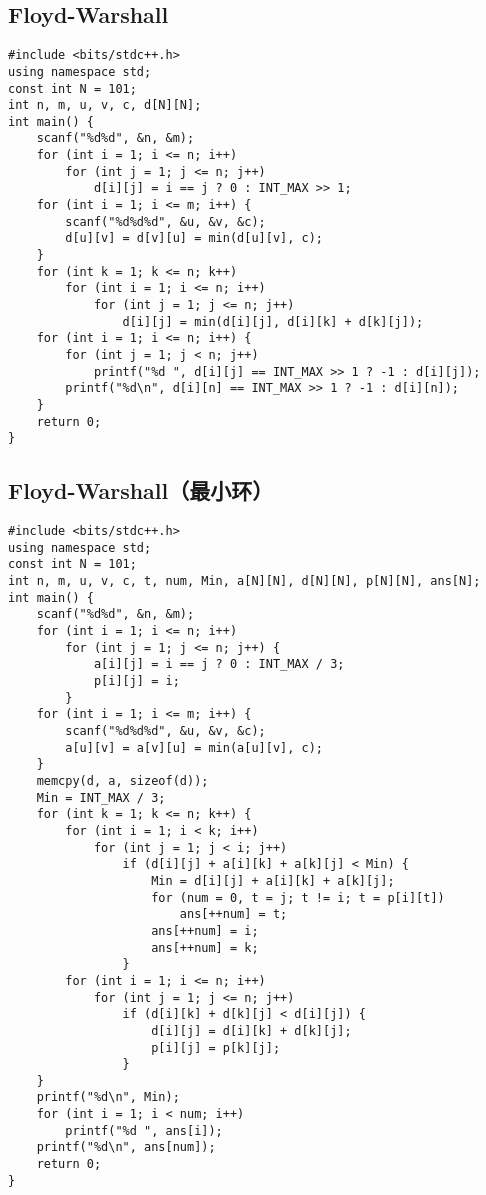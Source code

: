 \documentclass[a4paper]{article}
\begin{document}
\subsection{Floyd-Warshall}
\begin{lstlisting}
#include <bits/stdc++.h>
using namespace std;
const int N = 101;
int n, m, u, v, c, d[N][N];
int main() {
    scanf("%d%d", &n, &m);
    for (int i = 1; i <= n; i++)
        for (int j = 1; j <= n; j++)
            d[i][j] = i == j ? 0 : INT_MAX >> 1;
    for (int i = 1; i <= m; i++) {
        scanf("%d%d%d", &u, &v, &c);
        d[u][v] = d[v][u] = min(d[u][v], c);
    }
    for (int k = 1; k <= n; k++)
        for (int i = 1; i <= n; i++)
            for (int j = 1; j <= n; j++)
                d[i][j] = min(d[i][j], d[i][k] + d[k][j]);
    for (int i = 1; i <= n; i++) {
        for (int j = 1; j < n; j++)
            printf("%d ", d[i][j] == INT_MAX >> 1 ? -1 : d[i][j]);
        printf("%d\n", d[i][n] == INT_MAX >> 1 ? -1 : d[i][n]);
    }
    return 0;
}
\end{lstlisting}
\subsection{Floyd-Warshall（最小环）}
\begin{lstlisting}
#include <bits/stdc++.h>
using namespace std;
const int N = 101;
int n, m, u, v, c, t, num, Min, a[N][N], d[N][N], p[N][N], ans[N];
int main() {
    scanf("%d%d", &n, &m);
    for (int i = 1; i <= n; i++)
        for (int j = 1; j <= n; j++) {
            a[i][j] = i == j ? 0 : INT_MAX / 3;
            p[i][j] = i;
        }
    for (int i = 1; i <= m; i++) {
        scanf("%d%d%d", &u, &v, &c);
        a[u][v] = a[v][u] = min(a[u][v], c);
    }
    memcpy(d, a, sizeof(d));
    Min = INT_MAX / 3;
    for (int k = 1; k <= n; k++) {
        for (int i = 1; i < k; i++)
            for (int j = 1; j < i; j++)
                if (d[i][j] + a[i][k] + a[k][j] < Min) {
                    Min = d[i][j] + a[i][k] + a[k][j];
                    for (num = 0, t = j; t != i; t = p[i][t])
                        ans[++num] = t;
                    ans[++num] = i;
                    ans[++num] = k;
                }
        for (int i = 1; i <= n; i++)
            for (int j = 1; j <= n; j++)
                if (d[i][k] + d[k][j] < d[i][j]) {
                    d[i][j] = d[i][k] + d[k][j];
                    p[i][j] = p[k][j];
                }
    }
    printf("%d\n", Min);
    for (int i = 1; i < num; i++)
        printf("%d ", ans[i]);
    printf("%d\n", ans[num]);
    return 0;
}
\end{lstlisting}
\end{document}
